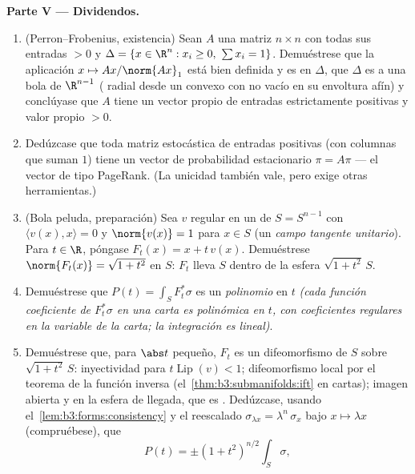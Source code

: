 \begin{problem}
\medskip
\noindent\textbf{Parte V --- Dividendos.}
\begin{enumerate}[resume]
  \item (Perron--Frobenius, existencia) Sean $A$ una matriz $n\times n$
  con todas sus entradas $> 0$ y
  $\Delta = \{x \in \R^n : x_i \geq 0,\ \sum x_i =
        1\}$. Demuéstrese que la aplicación $x \mapsto Ax/\norm{Ax}_1$
  está bien definida y es 
  en $\Delta$, que $\Delta$ es
   a una bola
   de $\R^{n-1}$
  ( radial desde un
   convexo con
   no vacío en su envoltura
  afín) y conclúyase que $A$ tiene un vector propio de entradas
  estrictamente positivas y valor propio $> 0$. \item Dedúzcase que toda
  matriz estocástica de entradas positivas (con columnas que suman $1$)
  tiene un vector de probabilidad estacionario $\pi = A\pi$ --- el
  vector de tipo PageRank. (La unicidad también vale, pero exige otras
  herramientas.) \item (Bola peluda, preparación) Sea $v$ regular en un
   de $S = S^{n-1}$ con
  $\langle v(x),
        x\rangle = 0$ y $\norm{v(x)} = 1$ para $x \in S$ (un \emph{campo
  tangente unitario}). Para $t \in \R$, póngase $F_t(x) = x + t\,v(x)$.
  Demuéstrese $\norm{F_t(x)} = \sqrt{1 + t^2}$ en $S$: $F_t$ lleva $S$
  dentro de la esfera $\sqrt{1+t^2}\,S$. \item Demuéstrese que
  $P(t) = \int_SF_t^*\sigma$ es un \emph{polinomio} en $t$ \emph{(cada
  función coeficiente de $F_t^*\sigma$ en una carta es polinómica en
  $t$, con coeficientes regulares en la variable de la carta; la
  integración es lineal)}. \item Demuéstrese que, para $\abs t$ pequeño,
  $F_t$ es un difeomorfismo de $S$ sobre $\sqrt{1+t^2}\,S$: inyectividad
  para $t\operatorname{Lip}(v) < 1$; difeomorfismo local por el teorema
  de la función inversa (el~\cref{thm:b3:submanifolds:ift} en cartas);
  imagen abierta y  en la
  esfera de llegada, que es .
  Dedúzcase, usando el~\cref{lem:b3:forms:consistency} y el reescalado
  $\sigma_{\lambda x} =
        \lambda^{n}\,\sigma_x$ bajo $x \mapsto \lambda x$ (compruébese),
  que
        \[
        P(t) = \pm(1 + t^2)^{n/2}\int_S\sigma,
\]
\end{enumerate}
\end{problem}
